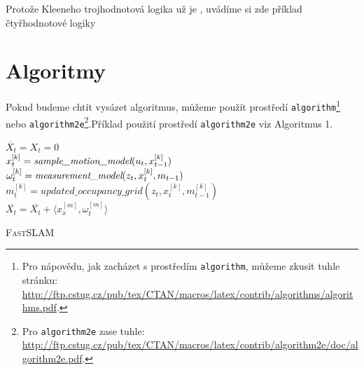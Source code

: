 \documentclass[a4paper, 11pt]{article}
\begin{document}
\begin{center}
\begin{table}[h]
	    \caption{Protože Kleeneho trojhodnotová logika už je , uvádíme si zde příklad čtyřhodnotové logiky}
	    \label{second_table}
    \end{table}
    \end{center}
    
    \hspace{0.1cm}
    
    \pagebreak

    \section{Algoritmy} \label{algoritmhs}
    Pokud budeme chtít vysázet algoritmus, můžeme použít prostředí \texttt{algorithm}\footnote{Pro nápovědu, jak zacházet s prostředím \texttt{algorithm}, můžeme zkusit tuhle stránku:\\ \href{http://ftp.cstug.cz/pub/tex/CTAN/macros/latex/contrib/algorithms/algorithms.pdf}{http://ftp.cstug.cz/pub/tex/CTAN/macros/latex/contrib/algorithms/algorithms.pdf}.} nebo \texttt{algorithm2e}\footnote{Pro \texttt{algorithm2e} zase tuhle: \href{http://ftp.cstug.cz/pub/tex/CTAN/macros/latex/contrib/algorithm2e/doc/algorithm2e.pdf}{http://ftp.cstug.cz/pub/tex/CTAN/macros/latex/contrib/algorithm2e/doc/algorithm2e.pdf}.}.\linebreak Příklad použití prostředí \texttt{algorithm2e} viz Algoritmus 1.
    
    \hspace{0.05cm}
    
    \IncMargin{1cm}
    \begin{algorithm}	
    	\SetNlSty{}{}{:}
    	\SetNlSkip{0.5cm}
    	\SetInd{0.4cm}{0.4cm}
    
    	\Indm\Indmm
    
    	\BlankLine
    
    	\Indp\Indpp
    	$ \overline{X_t} = X_t = 0 $ \\
    	{
    		$ x_t^{[k]} = \emph{sample\_motion\_model}(u_t, x_{t - 1}^{[k]}) $\\
    		$\omega_t^{[k]} = \emph{measurement\_model}(z_t, x_{t}^{[k]}, m_{t - 1}) $\\
    		$m_t^{[k]} = updated\_occupancy\_grid(z_t, x_{t}^{[k]}, m_{t - 1}^{[k]}) $\\
    		$\overline{X_t} = \overline{X_t} + \langle x_x^{[m]}, \omega_t^{[m]} \rangle $ \newline
    	}
    
    	\caption{\textsc{FastSLAM}}
    	\label{first_algorithm}
    \end{algorithm}
    
\end{document}
